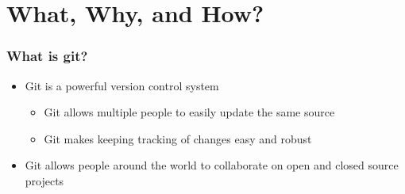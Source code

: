 \documentclass[unknownkeysallowed]{beamer}
\begin{document}
\section{What, Why, and How?}
\begin{frame}
    \frametitle{What is git?}
    \begin{itemize}
    	\item{Git is a powerful version control system}
    		\begin{itemize}
    			\item{Git allows multiple people to easily update the same source}
    			\item{Git makes keeping tracking of changes easy and robust}
    		\end{itemize}
    	\item{Git allows people around the world to collaborate on open and closed source projects}
   	\end{itemize}
    \vspace{1cm} %





\end{frame}
\end{document}
